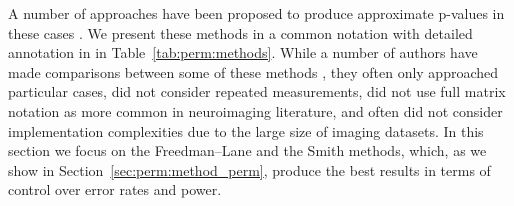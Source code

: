 A number of approaches have been proposed to produce approximate p-values in these cases \citep{Draper1966, Beaton1978, Still1981, Brown1982, Levin1983, Freedman1983, Oja1987, Gail1988, Welch1990, TerBraak1992, Kennedy1995, Edgington1995, Huh2001, Jung2006, Manly2007, Kherad2010}. We present these methods in a common notation with detailed annotation in in Table~\ref{tab:perm:methods}.  While a number of authors have made comparisons between some of these methods \citep{Kennedy1995, Kennedy1996, Gonzalez1998, Anderson1999, Anderson2001, Anderson2003, OGorman2005, Dekker2007, Nichols2008, Ridgway2009}, they often only approached particular cases, did not consider repeated measurements, did not use full matrix notation as more common in neuroimaging literature, and often did not consider implementation complexities due to the large size of imaging datasets. In this section we focus on the Freedman--Lane and the Smith methods, which, as we show in Section~\ref{sec:perm:method_perm}, produce the best results in terms of control over error rates and power.

